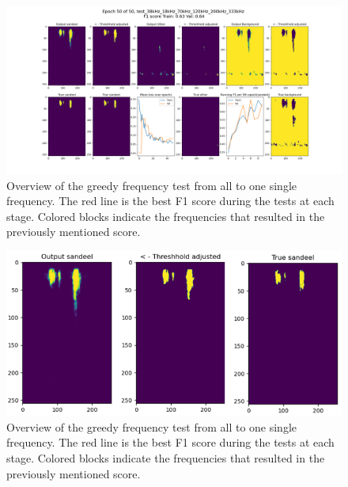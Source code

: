         
    \clearpage
    \begin{figure}[H]
        \centering
        \includegraphics[scale=0.3]{figures/epoch_50_test_38kHz_18kHz_70kHz_120kHz_200kHz_333kHz.png}
        \caption{Overview of the greedy frequency test from all to one single frequency. The red line is the best F1 score during the tests at each stage. Colored blocks indicate the frequencies that resulted in the previously mentioned score.}
      	\medskip 
        \label{test}
    \end{figure}
        \clearpage
    \begin{figure}[H]
        \centering
        \includegraphics[scale=0.7]{figures/SANDEEL_WITH_LABEL.png}
        \caption{Overview of the greedy frequency test from all to one single frequency. The red line is the best F1 score during the tests at each stage. Colored blocks indicate the frequencies that resulted in the previously mentioned score.}
      	\medskip 
        \label{sandeel_threshold_label}
    \end{figure}
    
    
    
